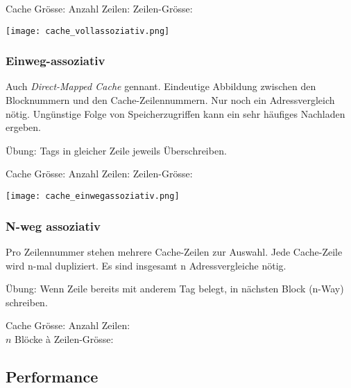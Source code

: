 Cache Grösse: 
Anzahl Zeilen: 
Zeilen-Grösse: 

\begin{center}
    \texttt{[image: cache\_vollassoziativ.png]}
\end{center}

\subsubsection{Einweg-assoziativ}

Auch \textit{Direct-Mapped Cache} gennant. Eindeutige Abbildung zwischen den Blocknummern und den Cache-Zeilennummern.
Nur noch ein Adressvergleich nötig. Ungünstige Folge von Speicherzugriffen kann ein sehr häufiges Nachladen ergeben.

Übung: Tags in gleicher Zeile jeweils Überschreiben.

Cache Grösse: 
Anzahl Zeilen: 
Zeilen-Grösse: 

\begin{center}
    \texttt{[image: cache\_einwegassoziativ.png]}
\end{center}

\subsubsection{N-weg assoziativ}

Pro Zeilennummer stehen mehrere Cache-Zeilen zur Auswahl. Jede Cache-Zeile wird n-mal dupliziert.
Es sind insgesamt n Adressvergleiche nötig.

Übung: Wenn Zeile bereits mit anderem Tag belegt, in nächsten Block (n-Way) schreiben.

Cache Grösse: 
Anzahl Zeilen: \\
$n$ Blöcke à Zeilen-Grösse: 

\subsection{Performance}


